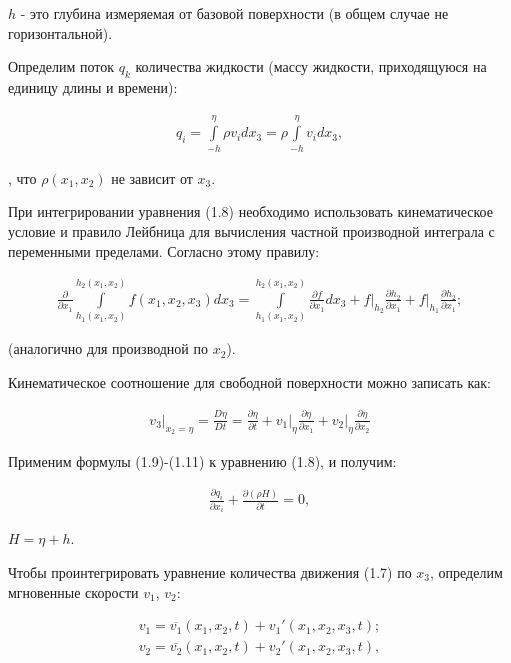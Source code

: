 \documentclass[14pt]{extreport}
\begin{document}
 $h$ - это глубина измеряемая от базовой поверхности (в общем случае не горизонтальной).

Определим поток $ q_k $ количества жидкости (массу жидкости, приходящуюся на единицу длины и времени):


\begin{gather}
q_i = \int\limits^\eta_{-h} \rho v_i dx_3 = \rho \int\limits^\eta_{-h} v_i dx_3,
\end{gather}

, что $\rho(x_1, x_2)$ не зависит от $x_3$.

При интегрировании уравнения (1.8) необходимо использовать кинематическое условие и правило Лейбница \cite{Zorich:2002:CALC} для вычисления частной производной интеграла с переменными пределами. Согласно этому правилу:


\begin{gather}
\frac{\partial}{\partial x_1} \int\limits^{h_2(x_1,x_2)}_{h_1(x_1,x_2)} f(x_1, x_2, x_3) dx_3=\int\limits^{h_2(x_1,x_2)}_{h_1(x_1,x_2)} \frac{\partial f}{\partial x_1} dx_3 + f \bigg|_{h_2}  \frac{\partial h_2}{\partial x_1} + f \bigg|_{h_1} \frac{\partial h_2}{\partial x_1};
\end{gather}

\noindent(аналогично для производной по $x_2$).

Кинематическое соотношение для свободной поверхности можно записать как:

\begin{gather}
v_3\bigg|_{x_2=\eta} = \frac{D\eta}{Dt} = \frac{\partial \eta}{\partial t} + v_1 \bigg|_{\eta} \frac{\partial \eta}{\partial x_1} + v_2 \bigg|_{\eta}\frac{\partial \eta}{\partial x_2}
\end{gather}

Применим формулы (1.9)-(1.11) к уравнению (1.8), и получим:

\begin{gather}
\frac{ \partial q_i}{\partial x_i} + \frac{\partial(\rho H)}{\partial t} = 0,
\end{gather}

 $H=\eta+h $.

Чтобы проинтегрировать уравнение количества движения (1.7) по $x_3$, определим мгновенные скорости $v_1$, $v_2$:

\begin{gather}
v_1 = \overline{v_1} (x_1, x_2, t) + v_1'(x_1, x_2, x_3, t); \nonumber\\
v_2 = \overline{v_2} (x_1, x_2, t) + v_2'(x_1, x_2, x_3, t), \end{gather}
\end{document}
